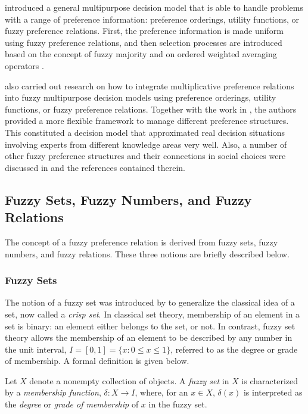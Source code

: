 \citet{Chiclana-et-al1998} introduced a general multipurpose decision model that is able to handle problems with a range of preference information: preference orderings, utility functions, or fuzzy preference relations. First, the preference information is made uniform using fuzzy preference relations, and then selection processes are introduced based on the concept of fuzzy majority \citep{Kacprzyk1986} and on ordered weighted averaging operators \citep{Yager1988}.

\citet{Chiclana-et-al2001} also carried out research on how to integrate multiplicative preference relations into fuzzy multipurpose decision models using preference orderings, utility functions, or fuzzy preference relations. Together with the work in \citep{Chiclana-et-al1998}, the authors provided a more flexible framework to manage different preference structures. This constituted a decision model that approximated real decision situations involving experts from different knowledge areas very well. Also, a number of other fuzzy preference structures and their connections in social choices were discussed in \citep{Banerjee1994, Dutta1987, Richardson1998} and the references contained therein.

\subsection{Fuzzy Sets, Fuzzy Numbers, and Fuzzy Relations}

The concept of a fuzzy preference relation is derived from fuzzy sets, fuzzy numbers, and fuzzy relations. These three notions are briefly described below.

\subsubsection{Fuzzy Sets}

The notion of a fuzzy set was introduced by \citet{Zadeh1965} to generalize the classical idea of a set, now called a \emph{crisp set}. In classical set theory, membership of an element in a set is binary: an element either belongs to the set, or not. In contrast, fuzzy set theory allows the membership of an element to be described by any number in the unit interval, $I = [0, 1] = \{x: 0 \leq x \leq 1\}$, referred to as the degree or grade of membership. A formal definition is given below.

\begin{definition}
\rm Let $X$ denote a nonempty collection of objects. A \emph{fuzzy set} in $X$ is characterized by a \emph{membership function}, $\delta : X \longrightarrow I$, where, for an $x \in X$, $\delta(x)$ is interpreted as the \emph{degree} or \emph{grade of membership} of $x$ in the fuzzy set.
\end{definition}


